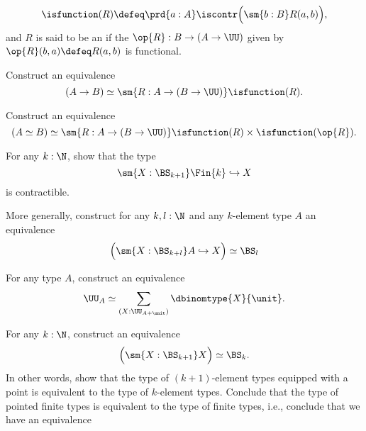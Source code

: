 \begin{exercises}
  \begin{equation*}
    \isfunction(R)\defeq\prd{a:A}\iscontr\Big(\sm{b:B}R(a,b)\Big),
  \end{equation*}
  and $R$ is said to be an  if the  $\op{R}:B\to(A\to\UU)$ given by $\op{R}(b,a)\defeq R(a,b)$ is functional.
  \begin{subexenum}
  \item Construct an equivalence
    \begin{equation*}
      (A\to B)\simeq \sm{R:A\to(B\to\UU)}\isfunction(R).
    \end{equation*}
  \item Construct an equivalence
    \begin{equation*}
      (A\simeq B)\simeq\sm{R:A\to (B\to\UU)}\isfunction(R)\times\isfunction(\op{R}).
    \end{equation*}
  \end{subexenum}
  \exitem
  \begin{subexenum}
  \item For any $k:\N$, show that the type
    \begin{equation*}
      \sm{X:\BS_{k+1}}\Fin{k}\hookrightarrow X
    \end{equation*}
    is contractible.
  \item More generally, construct for any $k,l:\N$ and any $k$-element type $A$ an equivalence
    \begin{equation*}
      \Big(\sm{X:\BS_{k+l}}A\hookrightarrow X\Big)\simeq \BS_l
    \end{equation*}
  \end{subexenum}
  \exitem \label{ex:complement-Fk}
  \begin{subexenum}
  \item For any type $A$, construct an equivalence
  \begin{equation*}
    \UU_A \simeq \sum_{(X:\UU_{A+\unit})}\dbinomtype{X}{\unit}.
  \end{equation*}
  \item For any $k:\N$, construct an equivalence
    \begin{equation*}
      \Big(\sm{X:\BS_{k+1}}X\Big)\simeq \BS_k.
    \end{equation*}
    In other words, show that the type of $(k+1)$-element types equipped with a point is equivalent to the type of $k$-element types. Conclude that the type of pointed finite types is equivalent to the type of finite types, i.e., conclude that we have an equivalence

\end{subexenum}
\end{exercises}
